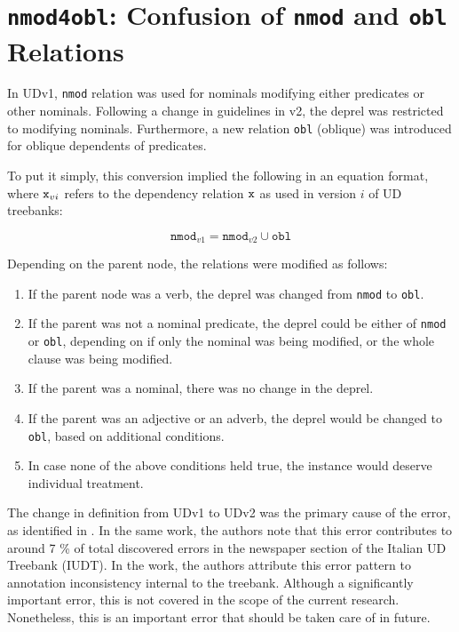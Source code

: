 \section{\texttt{nmod4obl}: Confusion of \texttt{nmod} and \texttt{obl} Relations}
\label{sec:probnmod4obl}

In UDv1, \verb|nmod| relation was used for nominals modifying either predicates or other nominals. Following a change in guidelines in v2, the deprel was restricted to modifying nominals. Furthermore, a new relation \verb|obl| (oblique) was introduced for oblique dependents of predicates.

To put it simply, this conversion implied the following in an equation format, where \(\verb|x|_{vi}\) refers to the dependency relation \(\verb|x|\) as used in version \(i\) of UD treebanks:

\begin{equation*}
    \boxed{\texttt{nmod}_{v1} = \texttt{nmod}_{v2} \cup \texttt{obl}}
\end{equation*}

Depending on the parent node, the relations were modified as follows:

\begin{enumerate}
    \item If the parent node was a verb, the deprel was changed from \texttt{nmod} to \texttt{obl}.
    \item If the parent was not a nominal predicate, the deprel could be either of \texttt{nmod} or \texttt{obl}, depending on if only the nominal was being modified, or the whole clause was being modified.
    \item If the parent was a nominal, there was no change in the deprel.
    \item If the parent was an adjective or an adverb, the deprel would be changed to \texttt{obl}, based on additional conditions.
    \item In case none of the above conditions held true, the instance would deserve individual treatment.
\end{enumerate}

The change in definition from UDv1 to UDv2 was the primary cause of the error, as identified in \cite{alzetta2017dangerous}. In the same work, the authors note that this error contributes to around 7 \% of total discovered errors in the newspaper section of the Italian UD Treebank (IUDT). In the work, the authors attribute this error pattern to annotation inconsistency internal to the treebank. Although a significantly important error, this is not covered in the scope of the current research. Nonetheless, this is an important error that should be taken care of in future.

